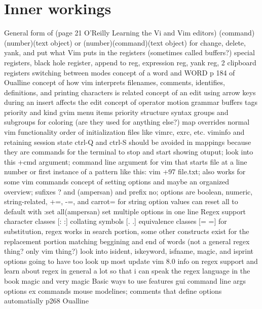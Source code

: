 \documentclass[12pt]{book}
\begin{document}
\section{Inner workings}
General form of (page 21 O'Reilly Learning the Vi and Vim editors) (command)(number)(text object) or (number)(command)(text object) for change, delete, yank, and put
what Vim puts in the registers (sometimes called buffers?) special registers, black hole register, append to reg, expression reg, yank reg, 2 clipboard registers
switching between modes
concept of a word and WORD p 184 of Oualline
  concept of how vim interprets filenames, comments, identifies, definitions, and printing characters is related
concept of an edit
  using arrow keys during an insert affects the edit
concept of operator motion grammar
buffers
tags priority and kind
gvim menu items priority structure
syntax groups and subgroups for coloring (are they used for anything else?)
map overrides normal vim functionality
order of initialization files like vimrc, exrc, etc.
viminfo and retaining session state
ctrl-Q and ctrl-S should be avoided in mappings because they are commands for the terminal to stop and start showing otuput; look into this
+cmd argument; command line argument for vim that starts file at a line number or first instance of a pattern like this: vim +97 file.txt; also works for some vim commands
concept of setting options and maybe an organized overview; sufixes ? and (ampersan) and prefix no;
  options are boolean, numeric, string-related,
    +=, -=, and carrot= for string option values
    can reset all to default with :set all(ampersan)
    set multiple options in one line
Regex support
  character classes [: :]
  collating symbols [. .]
  equivalence classes [= =]
  for substitution, regex works in search portion, some other constructs exist for the replacement portion
  matching beggining and end of words (not a general regex thing? only vim thing?)
  look into isident, iskeyword, isfname, magic, and isprint options
  going to have too look up most update vim 8.0 info on regex support and learn about regex in general a lot so that i can speak the regex language in the book
  magic and very magic
Basic ways to use features
  gui
  command line args
  options
  ex commands
  mouse
	modelines; comments that define options automatially p268 Oualline
\end{document}
